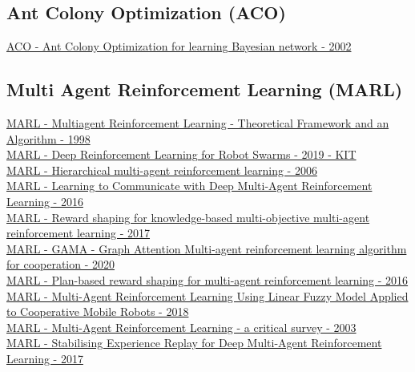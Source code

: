 \subsection{Ant Colony Optimization (ACO)}
\href{https://www.sciencedirect.com/science/article/pii/S0888613X02000919}{ACO - Ant Colony Optimization for learning Bayesian network - 2002}


\subsection{Multi Agent Reinforcement Learning (MARL)}
\href{https://dl.acm.org/doi/abs/10.5555/645527.657296}{MARL - Multiagent Reinforcement Learning - Theoretical Framework and an Algorithm - 1998}
\\
\href{https://publikationen.bibliothek.kit.edu/1000118251}{MARL - Deep Reinforcement Learning for Robot Swarms - 2019 - KIT}
\\
\href{https://link.springer.com/article/10.1007/s10458-006-7035-4}{MARL - Hierarchical multi-agent reinforcement learning - 2006}
\\
\href{https://arxiv.org/abs/1605.06676}{MARL - Learning to Communicate with Deep Multi-Agent Reinforcement Learning - 2016}
\\
\href{https://www.cambridge.org/core/journals/knowledge-engineering-review/article/reward-shaping-for-knowledgebased-multiobjective-multiagent-reinforcement-learning/75F1507F7CAC7C6625F87AE7CD344D52}{MARL - Reward shaping for knowledge-based multi-objective multi-agent reinforcement learning - 2017}
\\
\href{https://link.springer.com/article/10.1007/s10489-020-01755-8}{MARL - GAMA - Graph Attention Multi-agent reinforcement learning algorithm for cooperation - 2020}
\\
\href{https://www.cambridge.org/core/journals/knowledge-engineering-review/article/planbased-reward-shaping-for-multiagent-reinforcement-learning/B173D25B1006B755667616C3A3EB3BE5}{MARL - Plan-based reward shaping for multi-agent reinforcement learning - 2016}
\\
\href{https://www.mdpi.com/2073-8994/10/10/461}{MARL - Multi-Agent Reinforcement Learning Using Linear Fuzzy Model Applied to Cooperative Mobile Robots - 2018}
\\
\href{http://ai.stanford.edu/people/shoham/www%20papers/MALearning_ACriticalSurvey_2003_0516.pdf}{MARL - Multi-Agent Reinforcement Learning - a critical survey - 2003}
\\
\href{http://proceedings.mlr.press/v70/foerster17b.html}{MARL - Stabilising Experience Replay for Deep Multi-Agent Reinforcement Learning - 2017}
